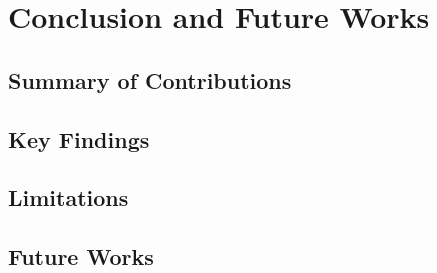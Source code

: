 \chapter{Conclusion and Future Works}
\label{ch:conclusion}

\section{Summary of Contributions}

\section{Key Findings}

\section{Limitations}

\section{Future Works}
